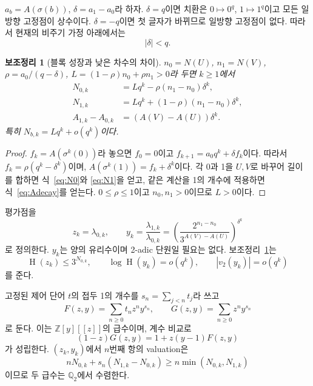 \documentclass[11pt,a4paper]{article}
\theoremstyle{koreanplain}
\newtheorem{lemma}[theorem]{보조정리}
\newcommand{\Q}{\mathbb Q}
\newcommand{\Z}{\mathbb Z}
\newcommand{\vTwo}{v_2}
\newcommand{\htQ}{\operatorname{H}}
\begin{document}
$a_b=A(\sigma(b))$, $\delta=a_1-a_0$라 하자. $\delta=q$이면 치환은 $0\mapsto0^q$, $1\mapsto1^q$이고 모든 일방향 고정점이 상수이다. $\delta=-q$이면 첫 글자가 바뀌므로 일방향 고정점이 없다. 따라서 현재의 비주기 가정 아래에서는
\begin{equation}\label{eq:delta}
|\delta|<q.
\end{equation}

\begin{lemma}[블록 성장과 낮은 차수의 차이]\label{lem:counts}
$n_0=N(U)$, $n_1=N(V)$, $\rho=a_0/(q-\delta)$,
$L=(1-\rho)n_0+\rho n_1>0$라 두면 $k\ge1$에서
\begin{align}
N_{0,k}&=Lq^k-\rho(n_1-n_0)\delta^k,\label{eq:N0}\\
N_{1,k}&=Lq^k+(1-\rho)(n_1-n_0)\delta^k,\label{eq:N1}\\
A_{1,k}-A_{0,k}&=(A(V)-A(U))\delta^k.\label{eq:Adecay}
\end{align}
특히 $N_{b,k}=Lq^k+o(q^k)$이다.
\end{lemma}

\begin{proof}
$f_k=A(\sigma^k(0))$라 놓으면 $f_0=0$이고
$f_{k+1}=a_0q^k+\delta f_k$이다. 따라서
$f_k=\rho(q^k-\delta^k)$이며,
$A(\sigma^k(1))=f_k+\delta^k$이다. 각 0과 1을 $U,V$로 바꾸어 길이를 합하면 식~\eqref{eq:N0}와 \eqref{eq:N1}을 얻고, 같은 계산을 1의 개수에 적용하면 식~\eqref{eq:Adecay}를 얻는다. $0\le\rho\le1$이고 $n_0,n_1>0$이므로 $L>0$이다.
\end{proof}

평가점을
\begin{equation}\label{eq:zy}
z_k=\lambda_{0,k},\qquad
y_k=\frac{\lambda_{1,k}}{\lambda_{0,k}}
=\left(\frac{2^{n_1-n_0}}{3^{A(V)-A(U)}}\right)^{\delta^k}
\end{equation}
로 정의한다. $y_k$는 양의 유리수이며 2-adic 단원일 필요는 없다. 보조정리~\ref{lem:counts}는
\begin{equation}\label{eq:smallheight}
\htQ(z_k)\le3^{N_{0,k}},\qquad
\log\htQ(y_k)=o(q^k),\qquad |\vTwo(y_k)|=o(q^k)
\end{equation}
를 준다.

고정된 제어 단어 $t$의 접두 1의 개수를 $s_n=\sum_{j<n}t_j$라 쓰고
\begin{equation}\label{eq:FG}
F(z,y)=\sum_{n\ge0}t_nz^ny^{s_n},\qquad
G(z,y)=\sum_{n\ge0}z^ny^{s_n}
\end{equation}
로 둔다. 이는 $\Z[y][[z]]$의 급수이며, 계수 비교로
\begin{equation}\label{eq:FGid}
(1-z)G(z,y)=1+z(y-1)F(z,y)
\end{equation}
가 성립한다. $(z_k,y_k)$에서 $n$번째 항의 valuation은
\[
nN_{0,k}+s_n(N_{1,k}-N_{0,k})\ge n\min(N_{0,k},N_{1,k})
\]
이므로 두 급수는 $\Q_2$에서 수렴한다.
\end{document}
